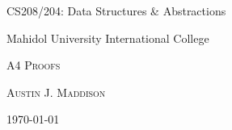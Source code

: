 \begin{titlepage}
	\centering

	{\small{CS208/204: Data Structures \& Abstractions} \par}
	{\small{Mahidol University International College} \par}
	\vfill

	{\Large \textsc{A4 Proofs}\par}
	\vspace{1cm}	
	{\textsc{Austin J. Maddison}\par}
	\vspace{0.3cm}	
	{\today\par}

	\vfill
\end{titlepage}